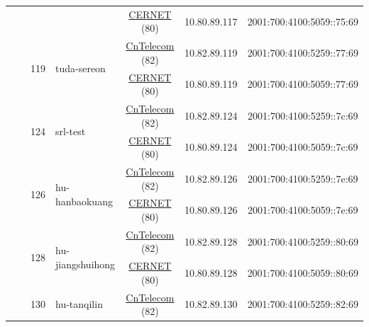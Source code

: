 \begin{small}
\begin{center}
\begin{longtable}{|c|c|c|c|c|c|c|c|}
  &  &  &  & \multicolumn{2}{|c|}{\tiny{\href{http://www.cernet.edu.cn}{CERNET} (80)}} & \tiny{10.80.89.117} & \tiny{2001:700:4100:5059::75:69} \\* \cline{3-3}\cline{4-4}\cline{5-5}\cline{6-6}\cline{7-7}\cline{8-8}
  &  & \multirow{2}{*}{\tiny{119}} & \multicolumn{1}{|l|}{\multirow{2}{*}{\tiny{tuda-sereon}}} & \multicolumn{2}{|c|}{\tiny{\href{http://www.chinatelecom.com.cn}{CnTelecom} (82)}} & \tiny{10.82.89.119} & \tiny{2001:700:4100:5259::77:69} \\* \cline{5-5}\cline{6-6}\cline{7-7}\cline{8-8}
  &  &  &  & \multicolumn{2}{|c|}{\tiny{\href{http://www.cernet.edu.cn}{CERNET} (80)}} & \tiny{10.80.89.119} & \tiny{2001:700:4100:5059::77:69} \\* \cline{3-3}\cline{4-4}\cline{5-5}\cline{6-6}\cline{7-7}\cline{8-8}
  &  & \multirow{2}{*}{\tiny{124}} & \multicolumn{1}{|l|}{\multirow{2}{*}{\tiny{srl-test}}} & \multicolumn{2}{|c|}{\tiny{\href{http://www.chinatelecom.com.cn}{CnTelecom} (82)}} & \tiny{10.82.89.124} & \tiny{2001:700:4100:5259::7c:69} \\* \cline{5-5}\cline{6-6}\cline{7-7}\cline{8-8}
  &  &  &  & \multicolumn{2}{|c|}{\tiny{\href{http://www.cernet.edu.cn}{CERNET} (80)}} & \tiny{10.80.89.124} & \tiny{2001:700:4100:5059::7c:69} \\* \cline{3-3}\cline{4-4}\cline{5-5}\cline{6-6}\cline{7-7}\cline{8-8}
  &  & \multirow{2}{*}{\tiny{126}} & \multicolumn{1}{|l|}{\multirow{2}{*}{\tiny{hu-hanbaokuang}}} & \multicolumn{2}{|c|}{\tiny{\href{http://www.chinatelecom.com.cn}{CnTelecom} (82)}} & \tiny{10.82.89.126} & \tiny{2001:700:4100:5259::7e:69} \\* \cline{5-5}\cline{6-6}\cline{7-7}\cline{8-8}
  &  &  &  & \multicolumn{2}{|c|}{\tiny{\href{http://www.cernet.edu.cn}{CERNET} (80)}} & \tiny{10.80.89.126} & \tiny{2001:700:4100:5059::7e:69} \\* \cline{3-3}\cline{4-4}\cline{5-5}\cline{6-6}\cline{7-7}\cline{8-8}
  &  & \multirow{2}{*}{\tiny{128}} & \multicolumn{1}{|l|}{\multirow{2}{*}{\tiny{hu-jiangshuihong}}} & \multicolumn{2}{|c|}{\tiny{\href{http://www.chinatelecom.com.cn}{CnTelecom} (82)}} & \tiny{10.82.89.128} & \tiny{2001:700:4100:5259::80:69} \\* \cline{5-5}\cline{6-6}\cline{7-7}\cline{8-8}
  &  &  &  & \multicolumn{2}{|c|}{\tiny{\href{http://www.cernet.edu.cn}{CERNET} (80)}} & \tiny{10.80.89.128} & \tiny{2001:700:4100:5059::80:69} \\* \cline{3-3}\cline{4-4}\cline{5-5}\cline{6-6}\cline{7-7}\cline{8-8}
  &  & \multirow{2}{*}{\tiny{130}} & \multicolumn{1}{|l|}{\multirow{2}{*}{\tiny{hu-tanqilin}}} & \multicolumn{2}{|c|}{\tiny{\href{http://www.chinatelecom.com.cn}{CnTelecom} (82)}} & \tiny{10.82.89.130} & \tiny{2001:700:4100:5259::82:69} \\* \cline{5-5}\cline{6-6}\cline{7-7}\cline{8-8}

\end{longtable}
\end{center}
\end{small}
